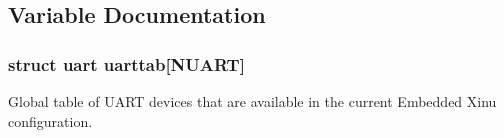 \subsection{Variable Documentation}
\hypertarget{group__uartgeneric_gaaba973119f71b1422dd48f51eb1dca51}{
\subsubsection[{uarttab}]{\setlength{\rightskip}{0pt plus 5cm}struct uart uarttab\mbox{[}N\-U\-A\-R\-T\mbox{]}}}\label{group__uartgeneric_gaaba973119f71b1422dd48f51eb1dca51}
Global table of U\-A\-R\-T devices that are available in the current Embedded Xinu configuration. 